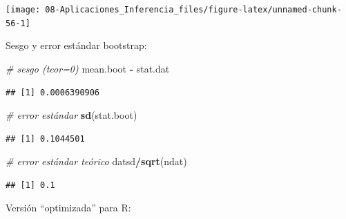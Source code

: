 \documentclass[
]{book}
\newenvironment{Shaded}{\begin{snugshade}}{\end{snugshade}}
\newcommand{\CommentTok}[1]{\textcolor[rgb]{0.56,0.35,0.01}{\textit{#1}}}
\newcommand{\KeywordTok}[1]{\textcolor[rgb]{0.13,0.29,0.53}{\textbf{#1}}}
\newcommand{\NormalTok}[1]{#1}
\newcommand{\OperatorTok}[1]{\textcolor[rgb]{0.81,0.36,0.00}{\textbf{#1}}}
\newcommand{\StringTok}[1]{\textcolor[rgb]{0.31,0.60,0.02}{#1}}
\theoremstyle{break}
\theoremstyle{definition}
\theoremstyle{definition}
\theoremstyle{definition}
\theoremstyle{remark}
\begin{document}
\begin{center}\texttt{[image: 08-Aplicaciones\_Inferencia\_files/figure-latex/unnamed-chunk-56-1]} \end{center}

Sesgo y error estándar bootstrap:

\begin{Shaded}
\begin{Highlighting}[]
\CommentTok{# sesgo (teor=0)}
\NormalTok{mean.boot }\OperatorTok{-}\StringTok{ }\NormalTok{stat.dat }
\end{Highlighting}
\end{Shaded}

\begin{verbatim}
## [1] 0.0006390906
\end{verbatim}

\begin{Shaded}
\begin{Highlighting}[]
\CommentTok{# error estándar}
\KeywordTok{sd}\NormalTok{(stat.boot) }
\end{Highlighting}
\end{Shaded}

\begin{verbatim}
## [1] 0.1044501
\end{verbatim}

\begin{Shaded}
\begin{Highlighting}[]
\CommentTok{# error estándar teórico}
\NormalTok{datsd}\OperatorTok{/}\KeywordTok{sqrt}\NormalTok{(ndat) }
\end{Highlighting}
\end{Shaded}

\begin{verbatim}
## [1] 0.1
\end{verbatim}

Versión ``optimizada'' para R:
\end{document}
